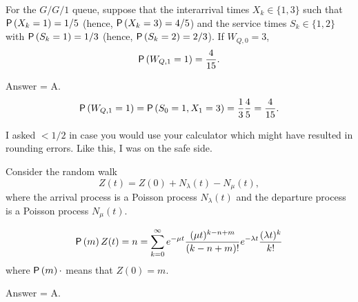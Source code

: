 \begin{exercise}[201703]
  For the $G/G/1$ queue, suppose that the interarrival times
  $X_k\in\{1,3\}$ such that $\P{X_k=1}=1/5$ (hence, $\P{X_k=3}=4/5$)
  and the service times $S_k\in\{1,2\}$ with $\P{S_k=1}=1/3$ (hence,
  $\P{S_k=2}=2/3$). If $W_{Q,0}=3$,
  \begin{equation*}
    \P{W_{Q,1} = 1} =\frac4{15}.
  \end{equation*}

\begin{solution}
    Answer = A.
  \begin{equation*}
    \P{W_{Q,1} = 1} = \P{S_0=1, X_1=3}=\frac13\frac 45 = \frac4{15}.
  \end{equation*}

  I asked $<1/2$ in case you would use your calculator which might
  have resulted in rounding errors. Like this, I was on the safe side.
\end{solution}
\end{exercise}

\begin{exercise}[201703] 
  Consider the random walk
\begin{equation*}
  Z(t) = Z(0) + N_\lambda(t) - N_\mu(t), 
\end{equation*}
where the arrival process is a Poisson process $N_\lambda(t)$ and the
departure process is a Poisson process $N_\mu(t)$. 

\begin{equation*}
  \begin{split}
    \P{m}{Z(t)=n} 
&= \sum_{k=0}^\infty e^{-\mu t} \frac{(\mu t)^{k -n+m}}{(k-n +m)!} e^{-\lambda t} \frac{(\lambda t)^k}{k!} \\
  \end{split}
\end{equation*}
where $\P{m}{\cdot}$ means that $Z(0)=m$.

\begin{solution}
    Answer = A.
\end{solution}
\end{exercise}


